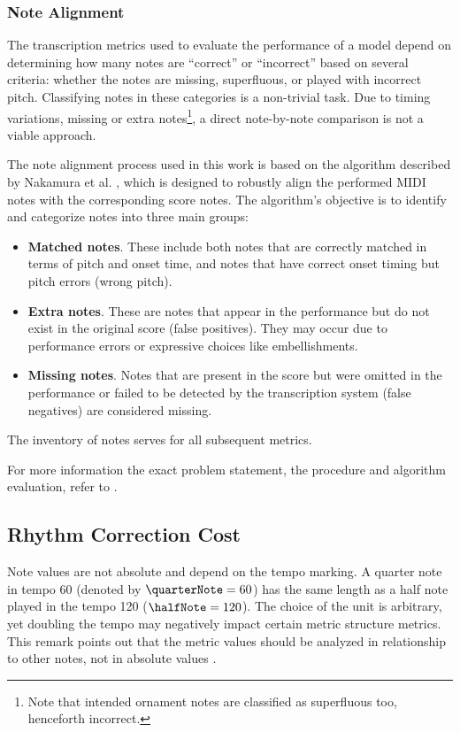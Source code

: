 \subsubsection{Note Alignment}

The transcription metrics used to evaluate the performance of a model depend on determining how many notes are ``correct'' or ``incorrect'' based on several criteria: whether the notes are missing, superfluous, or played with incorrect pitch. Classifying notes in these categories is a non-trivial task. Due to timing variations, missing or extra notes\footnote{Note that intended ornament notes are classified as superfluous too, henceforth incorrect.}, a direct note-by-note comparison is not a viable approach.

The note alignment process used in this work is based on the algorithm described by Nakamura et al. \cite{Nakamura2017b}, which is designed to robustly align the performed MIDI notes with the corresponding score notes. The algorithm’s objective is to identify and categorize notes into three main groups: \begin{itemize}
	\item {\bf Matched notes}. These include both notes that are correctly matched in terms of pitch and onset time, and notes that have correct onset timing but pitch errors (wrong pitch).
	\item {\bf Extra notes}. These are notes that appear in the performance but do not exist in the original score (false positives). They may occur due to performance errors or expressive choices like embellishments.
	\item {\bf Missing notes}. Notes that are present in the score but were omitted in the performance or failed to be detected by the transcription system (false negatives) are considered missing.
\end{itemize}

The inventory of notes serves for all subsequent metrics.

For more information the exact problem statement, the procedure and algorithm evaluation, refer to \cite{Nakamura2017b}.

\subsection{Rhythm Correction Cost}

Note values are not absolute and depend on the tempo marking. A quarter note in tempo $60$ (denoted by $\quarterNote = 60$) has the same length as a half note played in the tempo 120 ($\halfNote = 120$). The choice of the unit is arbitrary, yet doubling the tempo may negatively impact certain metric structure metrics. This remark points out that the metric values should be analyzed in relationship to other notes, not in absolute values \cite{Nakamura2017c}.

